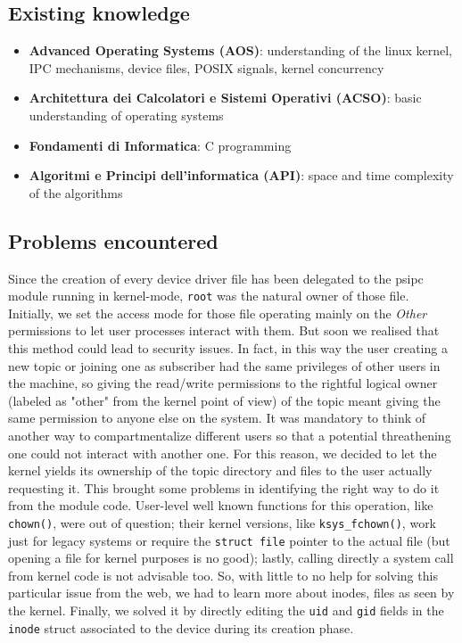 \documentclass[10pt,a4]{article}
\newcommand{\code}[1]{\texttt{#1}}
\begin{document}
\subsection{Existing knowledge}
\begin{itemize}
  \item \textbf{Advanced Operating Systems (AOS)}: understanding of the linux kernel, IPC mechanisms, device files, POSIX signals, kernel concurrency
  \item \textbf{Architettura dei Calcolatori e Sistemi Operativi (ACSO)}: basic understanding of operating systems
  \item \textbf{Fondamenti di Informatica}: C programming
  \item \textbf{Algoritmi e Principi dell'informatica (API)}: space and time complexity of the algorithms
\end{itemize}

\subsection{Problems encountered}
Since the creation of every device driver file has been delegated to the psipc module running in kernel-mode, \code{root} was the natural owner of those file. Initially, we set the access mode for those file operating mainly on the \textit{Other} permissions to let user processes interact with them. But soon we realised that this method could lead to security issues. In fact, in this way the user creating a new topic or joining one as subscriber had the same privileges of other users in the machine, so giving the read/write permissions to the rightful logical owner (labeled as "other" from the kernel point of view) of the topic meant giving the same permission to anyone else on the system. It was mandatory to think of another way to compartmentalize different users so that a potential threathening one could not interact with another one. For this reason, we decided to let the kernel yields its ownership of the topic directory and files to the user actually requesting it. This brought some problems in identifying the right way to do it from the module code. User-level well known functions for this operation, like \code{chown()}, were out of question; their kernel versions, like \code{ksys\_fchown()}, work just for legacy systems or require the \code{struct file} pointer to the actual file (but opening a file for kernel purposes is no good); lastly, calling directly a system call from kernel code is not advisable too. So, with little to no help for solving this particular issue from the web, we had to learn more about inodes, files as seen by the kernel. Finally, we solved it by directly editing the \code{uid} and \code{gid} fields in the \code{inode} struct associated to the device during its creation phase.
\end{document}
